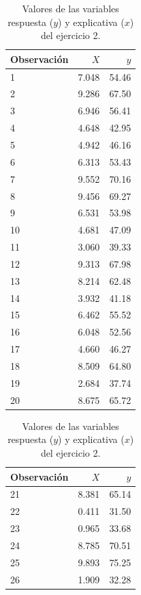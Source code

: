 \documentclass[10.5pt,notitlepage]{article}
\theoremstyle{plain}
\begin{document}
    \begin{table}[htbp]
        \caption{Valores de las variables respuesta ($y$) y explicativa ($x$) del ejercicio 2.}
        \centering\begin{tabular}{@{}lr@{\hskip 0.4in}r@{}}
            \toprule
            Observación & $X$ & $y$ \\
            \midrule
            1 & 7.048 & 54.46 \\
            2 & 9.286 & 67.50 \\
            3 & 6.946 & 56.41 \\
            4 & 4.648 & 42.95 \\
            5 & 4.942 & 46.16 \\
            6 & 6.313 & 53.43 \\
            7 & 9.552 & 70.16 \\
            8 & 9.456 & 69.27 \\
            9 & 6.531 & 53.98 \\
            10 & 4.681 & 47.09 \\
            11 & 3.060 & 39.33 \\
            12 & 9.313 & 67.98 \\
            13 & 8.214 & 62.48 \\
            14 & 3.932 & 41.18 \\
            15 & 6.462 & 55.52 \\
            16 & 6.048 & 52.56 \\
            17 & 4.660 & 46.27 \\
            18 & 8.509 & 64.80 \\
            19 & 2.684 & 37.74 \\
            20 & 8.675 & 65.72 \\
            \bottomrule
        \end{tabular} 
        \qquad\qquad
        \begin{tabular}{@{}lr@{\hskip 0.4in}r@{}}
            \toprule
            Observación & $X$ & $y$ \\
            \midrule
            21 & 8.381 & 65.14 \\
            22 & 0.411 & 31.50 \\
            23 & 0.965 & 33.68 \\
            24 & 8.785 & 70.51 \\
            25 & 9.893 & 75.25 \\
            26 & 1.909 & 32.28 \\

\end{tabular}
\end{table}
\end{document}
